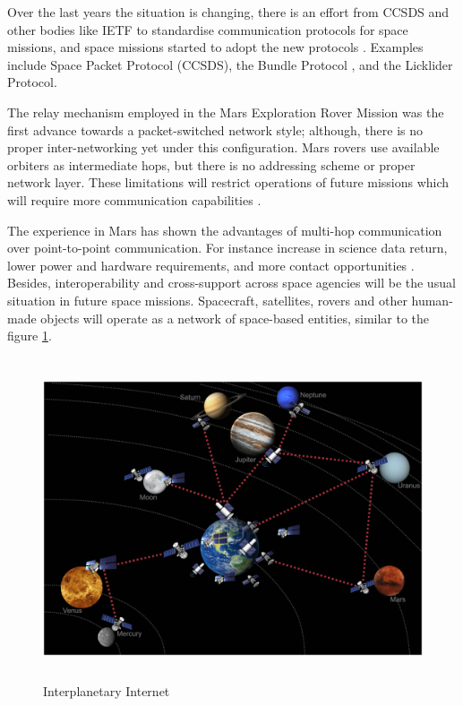 Over the last years the situation is changing, there is an effort from CCSDS and other bodies like IETF to standardise communication protocols for space missions, and space missions started to adopt the new protocols \cite{weber2006transforming}. Examples include Space Packet Protocol (CCSDS), the Bundle Protocol \cite{standard2010ccsds}, and the Licklider Protocol\cite{birrane-dtn-adm-ltp-00}.  %

The relay mechanism employed in the Mars Exploration Rover Mission was the first advance towards a packet-switched network style; although, there is no proper inter-networking yet under this configuration. Mars rovers use available orbiters as intermediate hops, but there is no addressing scheme or proper network layer. These limitations will restrict operations of future missions which will require more communication capabilities \cite{rationale2010requirements}. 


The experience in Mars has shown the advantages of multi-hop communication over point-to-point communication. For instance increase in science data return, lower power and hardware requirements, and more contact opportunities \cite{rationale2010requirements}.  Besides, interoperability and cross-support across space agencies will be the usual situation in future space missions. Spacecraft, satellites, rovers and other human-made objects will operate as a network of space-based entities, similar to the figure \ref{fig:inter-internet}. 



\begin{figure}[ht]
\centering
\includegraphics[width=1 \linewidth, height=9.5cm]{images/interplanetary.png} 
\caption{Interplanetary Internet}
\label{fig:inter-internet}
\end{figure}


